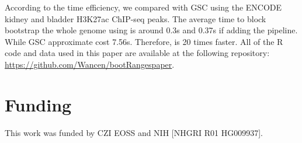 According to the time efficiency, we compared with GSC using the ENCODE kidney and bladder H3K27ac ChIP-seq peaks. The average time to block bootstrap the whole genome using \bootranges is around 0.3s and 0.37s if adding the \plyranges pipeline. While GSC approximate cost 7.56s. Therefore, \bootranges is 20 times faster.
All of the R code and data used in this paper are available at the following repository:
\url{https://github.com/Wancen/bootRangespaper}. 


  

\vspace*{-25pt}

\section*{Funding}
This work was funded by CZI EOSS and NIH [NHGRI R01 HG009937]. 
